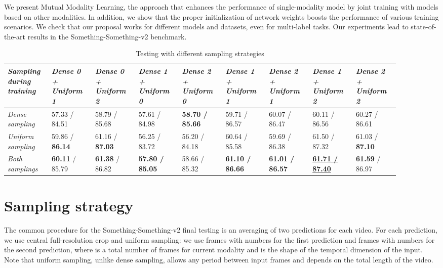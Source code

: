 \documentclass[conference]{IEEEtran}
\begin{document}
We present Mutual Modality Learning, the approach that enhances the performance of single-modality model by joint training with models based on other modalities. In addition, we show that the proper initialization of network weights boosts the performance of various training scenarios. We check that our proposal works for different models and datasets, even for multi-label tasks. Our experiments lead to state-of-the-art results in the Something-Something-v2 benchmark.




\begin{table*}[!h]
	\centering
	\caption{Testing with different sampling strategies}
	\label{tab:sampling}
	\centering
	\begin{tabular}{|p{0.1\linewidth}|p{0.1\linewidth}|p{0.1\linewidth}|p{0.1\linewidth}|p{0.1\linewidth}|p{0.1\linewidth}|p{0.1\linewidth}|p{0.1\linewidth}|p{0.1\linewidth}|} 
		\hline \it Sampling during training & \it Dense 0 + Uniform 1 & \it Dense 0 + Uniform 2 & \it Dense 1 + Uniform 0 & \it Dense 2 + Uniform 0 & \it Dense 1 + Uniform 1 & \it Dense 2 + Uniform 1 & \it Dense 1 + Uniform 2 & \it Dense 2 + Uniform 2 \\ \hline
		\it Dense sampling & 57.33 / 84.51 & 58.79 / 85.68 & 57.61 / 84.98 & \bf 58.70 / 85.66 & 59.71 / 86.57 & 60.07 / 86.47 & 60.11 / 86.56 & 60.27 / 86.61 \\ \hline 
		\it Uniform sampling & 59.86 / \textbf{86.14} & 61.16 / \textbf{87.03} & 56.25 / 83.72 & 56.20 / 84.18 & 60.64 / 85.58 & 59.69 / 86.38 & 61.50 / 87.32 & 61.03 / \textbf{87.10} \\ \hline 
		\it Both samplings & \textbf{60.11} / 85.79 & \textbf{61.38} / 86.82 & \bf 57.80 / 85.05 & 58.66 / 85.32 & \bf 61.10 / 86.66 & \bf 61.01 / 86.57 & \bf \underline{61.71 / 87.40} & \textbf{61.59} / 86.97 \\ \hline 	
	\end{tabular}
\end{table*}

\newpage

\appendices

\section{Sampling strategy} \label{app:a}

The common procedure for the Something-Something-v2 final testing is an averaging of two predictions for each video. For each prediction, we use central full-resolution crop and uniform sampling: we use frames with numbers  for the first prediction and frames with numbers  for the second prediction, where  is a total number of frames for current modality and  is the shape of the temporal dimension of the input. Note that uniform sampling, unlike dense sampling, allows any period between input frames and depends on the total length of the video.
\end{document}

